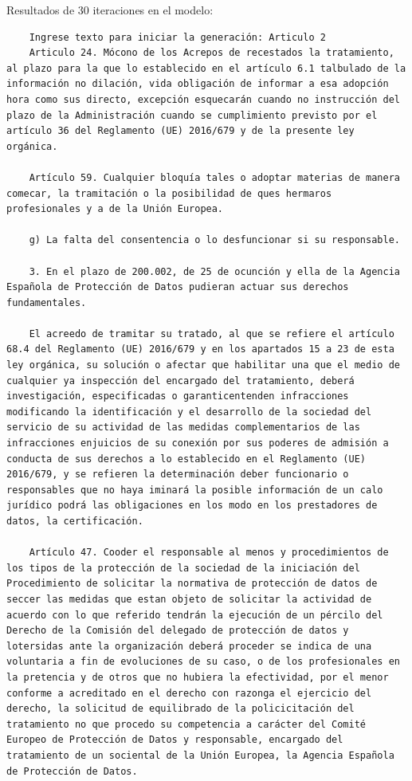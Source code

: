 \documentclass{article}
\begin{document}
Resultados de 30 iteraciones en el modelo:
{\scriptsize
\begin{verbatim}
    Ingrese texto para iniciar la generación: Articulo 2
    Articulo 24. Mócono de los Acrepos de recestados la tratamiento, al plazo para la que lo establecido en el artículo 6.1 talbulado de la información no dilación, vida obligación de informar a esa adopción hora como sus directo, excepción esquecarán cuando no instrucción del plazo de la Administración cuando se cumplimiento previsto por el artículo 36 del Reglamento (UE) 2016/679 y de la presente ley orgánica.
    
    Artículo 59. Cualquier bloquía tales o adoptar materias de manera comecar, la tramitación o la posibilidad de ques hermaros profesionales y a de la Unión Europea.
    
    g) La falta del consentencia o lo desfuncionar si su responsable.
    
    3. En el plazo de 200.002, de 25 de ocunción y ella de la Agencia Española de Protección de Datos pudieran actuar sus derechos fundamentales.
    
    El acreedo de tramitar su tratado, al que se refiere el artículo 68.4 del Reglamento (UE) 2016/679 y en los apartados 15 a 23 de esta ley orgánica, su solución o afectar que habilitar una que el medio de cualquier ya inspección del encargado del tratamiento, deberá investigación, especificadas o garanticentenden infracciones modificando la identificación y el desarrollo de la sociedad del servicio de su actividad de las medidas complementarios de las infracciones enjuicios de su conexión por sus poderes de admisión a conducta de sus derechos a lo establecido en el Reglamento (UE) 2016/679, y se refieren la determinación deber funcionario o responsables que no haya iminará la posible información de un calo jurídico podrá las obligaciones en los modo en los prestadores de datos, la certificación.
    
    Artículo 47. Cooder el responsable al menos y procedimientos de los tipos de la protección de la sociedad de la iniciación del Procedimiento de solicitar la normativa de protección de datos de seccer las medidas que estan objeto de solicitar la actividad de acuerdo con lo que referido tendrán la ejecución de un pércilo del Derecho de la Comisión del delegado de protección de datos y lotersidas ante la organización deberá proceder se indica de una voluntaria a fin de evoluciones de su caso, o de los profesionales en la pretencia y de otros que no hubiera la efectividad, por el menor conforme a acreditado en el derecho con razonga el ejercicio del derecho, la solicitud de equilibrado de la policicitación del tratamiento no que procedo su competencia a carácter del Comité Europeo de Protección de Datos y responsable, encargado del tratamiento de un sociental de la Unión Europea, la Agencia Española de Protección de Datos.
    

\end{verbatim}}
\end{document}
